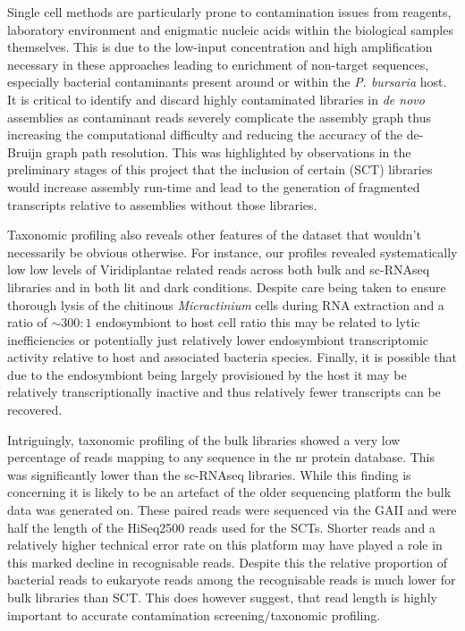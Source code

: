 Single cell methods are particularly prone to contamination issues
from reagents, laboratory environment and enigmatic nucleic acids within the biological samples themselves.
This is due to the low-input concentration and high amplification necessary in these approaches \citep{Blainey2013} 
leading to enrichment of non-target sequences, especially bacterial contaminants present around or within the
\textit{P. bursaria} host.  
It is critical to identify and discard highly contaminated libraries in \textit{de novo} assemblies as contaminant
reads severely complicate the assembly graph thus increasing the computational difficulty and reducing the accuracy
of the de-Bruijn graph path resolution.  This was highlighted by observations in the preliminary 
stages of this project that the inclusion of certain (SCT) libraries would increase
assembly run-time and lead to the generation of fragmented transcripts relative to assemblies without those
libraries.  

Taxonomic profiling also reveals other features of the dataset that wouldn't necessarily be
obvious otherwise.  For instance, our profiles revealed systematically low 
low levels of Viridiplantae related reads across both bulk and sc-RNAseq libraries and in both lit and dark conditions.  
Despite care being taken to ensure thorough lysis of the chitinous \textit{Micractinium} cells during 
RNA extraction and a ratio of \(\sim 300:1\) endosymbiont to host cell ratio this may be related to lytic inefficiencies \citep{Korfhage2015} or potentially
just relatively lower endosymbiont transcriptomic activity relative to host and associated bacteria species.
Finally, it is possible that due to the endosymbiont being largely provisioned by the host it may be relatively
transcriptionally inactive and thus relatively fewer transcripts can be recovered. 



Intriguingly, taxonomic profiling of the bulk libraries showed a very low percentage of reads 
mapping to any sequence in the nr protein database.  This was significantly lower than the
sc-RNAseq libraries.  While this finding is concerning it is likely to be an artefact of the older 
sequencing platform the bulk data was generated on.
These paired reads were sequenced via the GAII and were half the length of the HiSeq2500 reads used for 
the SCTs.  Shorter reads and a relatively higher
technical error rate on this platform may have played a role in this marked decline in recognisable reads. 
Despite this the relative proportion of bacterial reads to eukaryote reads among the 
recognisable reads is much lower for bulk libraries than SCT.  This does however suggest, that
read length is highly important to accurate contamination screening/taxonomic profiling.

